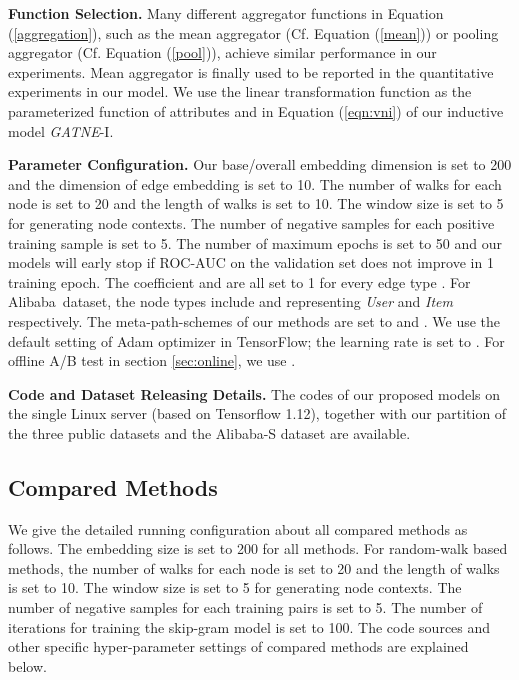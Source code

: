 \documentclass[sigconf]{acmart}
\newcommand{\company}{Alibaba}
\newcommand{\model}{{\em GATNE}}
\newcommand{\hide}[1]{} \newcommand{\jie}[1]{\textbf{\color{red}[(JT: #1 )]}}  \newcommand{\vpara}[1]{\vspace{0.07in}\noindent\textbf{#1 }}
\begin{document}
\vpara{Function Selection.}
Many different aggregator functions in Equation (\ref{aggregation}), such as the mean aggregator (Cf. Equation (\ref{mean})) or pooling aggregator (Cf. Equation (\ref{pool})), achieve similar performance in our experiments. Mean aggregator is finally used to be reported in the quantitative experiments in our model. We use the linear transformation function as the parameterized function of attributes  and  in Equation (\ref{eqn:vni}) of our inductive model \model-I.

\vpara{Parameter Configuration.}
Our base/overall embedding dimension  is set to 200 and the dimension of edge embedding  is set to 10. The number of walks for each node is set to 20 and the length of walks is set to 10. The window size is set to 5 for generating node contexts. The number of negative samples  for each positive training sample is set to 5. The number of maximum epochs is set to 50 and our models will early stop if ROC-AUC on the validation set does not improve in 1 training epoch. The coefficient  and  are all set to 1 for every edge type . For \company\ dataset, the node types include  and  representing \textit{User} and \textit{Item} respectively. The meta-path-schemes of our methods are set to  and . We use the default setting of Adam optimizer in TensorFlow; the learning rate is set to . For offline A/B test in section \ref{sec:online}, we use .

\vpara{Code and Dataset Releasing Details.}
The codes of our proposed models on the single Linux server (based on Tensorflow 1.12), together with our partition of the three public datasets and the \company-S dataset are available. 

\subsection{Compared Methods}
We give the detailed running configuration about all compared methods as follows.
\hide{We compare our model with the following methods of different types. For the experiment conducted on a single Linux server, these methods' implementation details are described as follows.} The embedding size is set to 200 for all methods. For random-walk based methods, the number of walks for each node is set to 20 and the length of walks is set to 10. The window size is set to 5 for generating node contexts. The number of negative samples for each training pairs is set to 5. The number of iterations for training the skip-gram model is set to 100. The code sources and other specific hyper-parameter settings of compared methods are explained below. 
\end{document}
